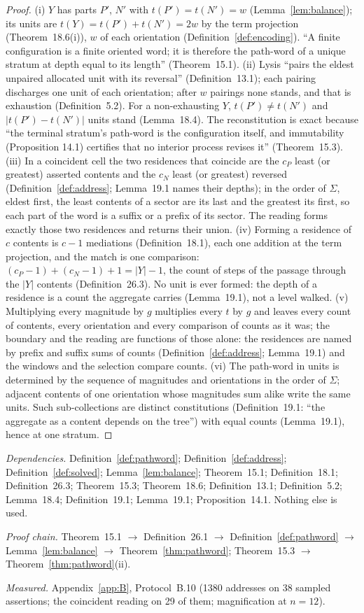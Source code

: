 \documentclass[pdflatex,sn-mathphys-num]{sn-jnl}
\theoremstyle{thmstyleone}%
\theoremstyle{thmstyletwo}%
\theoremstyle{thmstylethree}%
\newcommand{\q}[1]{``#1''}        %
\newcommand{\deps}[1]{\par\begin{sloppypar}\noindent\emph{Dependencies.} #1 Nothing else is used.\end{sloppypar}}
\newcommand{\chain}[1]{\par\begin{sloppypar}\noindent\emph{Proof chain.} #1\end{sloppypar}}
\newcommand{\measured}[1]{\par\begin{sloppypar}\noindent\emph{Measured.} #1\end{sloppypar}}
\begin{document}
\begin{proof}
(i) $Y$ has parts $P'$, $N'$ with $t(P')=t(N')=w$ (Lemma~\ref{lem:balance}); its units are $t(Y)=t(P')+t(N')=2w$ by the term projection (Theorem~18.6(i)), $w$ of each orientation (Definition~\ref{def:encoding}). \q{A finite configuration is a finite oriented word; it is therefore the path-word of a unique stratum at depth equal to its length} (Theorem~15.1). (ii) Lysis \q{pairs the eldest unpaired allocated unit with its reversal} (Definition~13.1); each pairing discharges one unit of each orientation; after $w$ pairings none stands, and that is exhaustion (Definition~5.2). For a non-exhausting $Y$, $t(P')\ne t(N')$ and $|t(P')-t(N')|$ units stand (Lemma~18.4). The reconstitution is exact because \q{the terminal stratum's path-word is the configuration itself, and immutability (Proposition 14.1) certifies that no interior process revises it} (Theorem~15.3). (iii) In a coincident cell the two residences that coincide are the $c_P$ least (or greatest) asserted contents and the $c_N$ least (or greatest) reversed (Definition~\ref{def:address}; Lemma~19.1 names their depths); in the order of $\Sigma$, eldest first, the least contents of a sector are its last and the greatest its first, so each part of the word is a suffix or a prefix of its sector. The reading forms exactly those two residences and returns their union. (iv) Forming a residence of $c$ contents is $c-1$ mediations (Definition~18.1), each one addition at the term projection, and the match is one comparison: $(c_P-1)+(c_N-1)+1=|Y|-1$, the count of steps of the passage through the $|Y|$ contents (Definition~26.3). No unit is ever formed: the depth of a residence is a count the aggregate carries (Lemma~19.1), not a level walked. (v) Multiplying every magnitude by $g$ multiplies every $t$ by $g$ and leaves every count of contents, every orientation and every comparison of counts as it was; the boundary and the reading are functions of those alone: the residences are named by prefix and suffix sums of counts (Definition~\ref{def:address}; Lemma~19.1) and the windows and the selection compare counts. (vi) The path-word in units is determined by the sequence of magnitudes and orientations in the order of $\Sigma$; adjacent contents of one orientation whose magnitudes sum alike write the same units. Such sub-collections are distinct constitutions (Definition~19.1: \q{the aggregate as a content depends on the tree}) with equal counts (Lemma~19.1), hence at one stratum.
\end{proof}
\deps{Definition~\ref{def:pathword}; Definition~\ref{def:address}; Definition~\ref{def:solved}; Lemma~\ref{lem:balance}; Theorem~15.1; Definition~18.1; Definition~26.3; Theorem~15.3; Theorem~18.6; Definition~13.1; Definition~5.2; Lemma~18.4; Definition~19.1; Lemma~19.1; Proposition~14.1.}
\chain{Theorem~15.1 $\to$ Definition~26.1 $\to$ Definition~\ref{def:pathword} $\to$ Lemma~\ref{lem:balance} $\to$ Theorem~\ref{thm:pathword}; Theorem~15.3 $\to$ Theorem~\ref{thm:pathword}(ii).}
\measured{Appendix~\ref{app:B}, Protocol~B.10 (1380 addresses on 38 sampled assertions; the coincident reading on 29 of them; magnification at $n=12$).}
\end{document}
